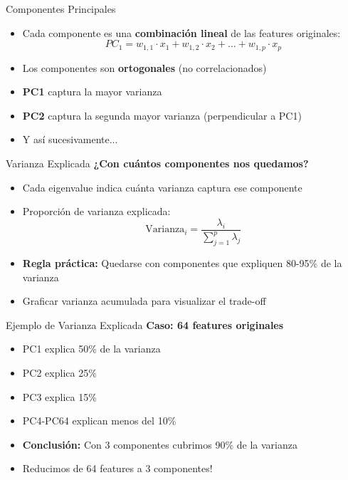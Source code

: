 \documentclass{beamer}
\begin{document}
\begin{frame}{Componentes Principales}
    \begin{itemize}
        \item<1-> Cada componente es una \textbf{combinación lineal} de las features originales:
        \[
        PC_1 = w_{1,1} \cdot x_1 + w_{1,2} \cdot x_2 + \ldots + w_{1,p} \cdot x_p
        \]
        \item<2-> Los componentes son \textbf{ortogonales} (no correlacionados)
        \item<3-> \textbf{PC1} captura la mayor varianza
        \item<4-> \textbf{PC2} captura la segunda mayor varianza (perpendicular a PC1)
        \item<5-> Y así sucesivamente...
    \end{itemize}
\end{frame}

\begin{frame}{Varianza Explicada}
    \textbf{¿Con cuántos componentes nos quedamos?}
    \begin{itemize}
        \item<1-> Cada eigenvalue indica cuánta varianza captura ese componente
        \item<2-> Proporción de varianza explicada:
        \[
        \text{Varianza}_i = \frac{\lambda_i}{\sum_{j=1}^{p} \lambda_j}
        \]
        \item<3-> \textbf{Regla práctica:} Quedarse con componentes que expliquen 80-95\% de la varianza
        \item<4-> Graficar varianza acumulada para visualizar el trade-off
    \end{itemize}
\end{frame}

\begin{frame}{Ejemplo de Varianza Explicada}
    \textbf{Caso: 64 features originales}
    \begin{itemize}
        \item<1-> PC1 explica 50\% de la varianza
        \item<2-> PC2 explica 25\%
        \item<3-> PC3 explica 15\%
        \item<4-> PC4-PC64 explican menos del 10\%
        \item<5-> \textbf{Conclusión:} Con 3 componentes cubrimos 90\% de la varianza
        \item<6-> Reducimos de 64 features a 3 componentes!
    \end{itemize}
\end{frame}
\end{document}
